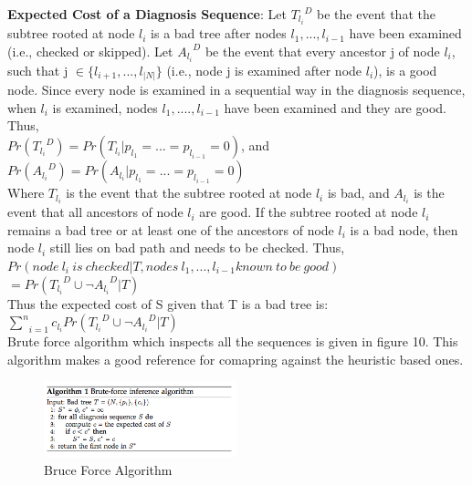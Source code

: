 \documentclass[10pt]{sigplan-proc-varsize}
\begin{document}
{\bf Expected Cost of  a Diagnosis Sequence}: Let ${T_{l_i}}^D$ be the event that the subtree rooted at node ${l_i}$ is a bad tree after nodes ${{l_1},...,{l_{i-1}}}$ have been examined (i.e., checked or skipped). Let ${A_{l_i}}^D$ be the event that every ancestor j of node ${l_i}$, such that j $\in\{l_{i+1},...,l_{|N|}\}$ (i.e., node j is examined after node ${l_i}$), is a good node. Since every node is examined in a sequential way in the diagnosis sequence, when $l_i$ is examined, nodes $l_1,....,l_{i-1}$ have been examined and they are good. Thus, \\
$Pr({T_{l_i}}^D) = Pr(T_{l_i}|p_{l_1}= ... = p_{l_{i-1}} = 0)$, and \\
$Pr({A_{l_i}}^D) = Pr(A_{l_i}|p_{l_1}= ... = p_{l_{i-1}} = 0)$ \\
Where $T_{l_i}$ is the event that the subtree rooted at node $l_i$ is bad, and $A_{l_i}$ is the event that all ancestors of node $l_i$ are good. If the subtree rooted at node $l_i$ remains a bad tree or at least one of the ancestors of node $l_i$ is a bad node, then node $l_i$ still lies on bad path and needs to be checked. Thus, \\
$ Pr(node\ l_i\ is\ checked| T, nodes\ l_1,...,l_{i-1} known\ to\ be\ good)$ \\
$=Pr({T_{l_i}}^D \cup \neg{{A_{l_i}}^D} | T)$\\
Thus the expected cost of S given that T is a bad tree is: \\
$ \underset{i=1}{\overset{n}{\sum}} c_{l_i} Pr({T_{l_i}}^D \cup \neg{{A_{l_i}}^D} | T)$\\
Brute force algorithm which inspects all the sequences is given in figure 10. This algorithm makes a good reference for comapring against the heuristic based ones.

\begin{figure}[h!]
  \caption{Bruce Force Algorithm}
  \centering
    \includegraphics[width=0.5\textwidth]{Fig10}
\end{figure}
\end{document}
